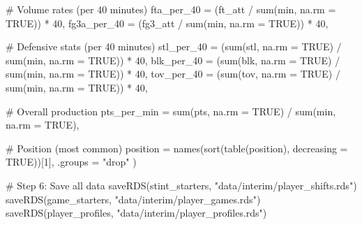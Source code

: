 \documentclass[
  letterpaper,
  DIV=11,
  numbers=noendperiod]{scrartcl}
\newenvironment{Shaded}{\begin{snugshade}}{\end{snugshade}}
\newcommand{\AttributeTok}[1]{\textcolor[rgb]{0.40,0.45,0.13}{#1}}
\newcommand{\CommentTok}[1]{\textcolor[rgb]{0.37,0.37,0.37}{#1}}
\newcommand{\ConstantTok}[1]{\textcolor[rgb]{0.56,0.35,0.01}{#1}}
\newcommand{\DecValTok}[1]{\textcolor[rgb]{0.68,0.00,0.00}{#1}}
\newcommand{\FunctionTok}[1]{\textcolor[rgb]{0.28,0.35,0.67}{#1}}
\newcommand{\NormalTok}[1]{\textcolor[rgb]{0.00,0.23,0.31}{#1}}
\newcommand{\SpecialCharTok}[1]{\textcolor[rgb]{0.37,0.37,0.37}{#1}}
\newcommand{\StringTok}[1]{\textcolor[rgb]{0.13,0.47,0.30}{#1}}
\begin{document}
\begin{Shaded}
\begin{Highlighting}[]
    \CommentTok{\# Volume rates (per 40 minutes)}
    \AttributeTok{fta\_per\_40 =}\NormalTok{ (ft\_att }\SpecialCharTok{/} \FunctionTok{sum}\NormalTok{(min, }\AttributeTok{na.rm =} \ConstantTok{TRUE}\NormalTok{)) }\SpecialCharTok{*} \DecValTok{40}\NormalTok{,}
    \AttributeTok{fg3a\_per\_40 =}\NormalTok{ (fg3\_att }\SpecialCharTok{/} \FunctionTok{sum}\NormalTok{(min, }\AttributeTok{na.rm =} \ConstantTok{TRUE}\NormalTok{)) }\SpecialCharTok{*} \DecValTok{40}\NormalTok{,}

    \CommentTok{\# Defensive stats (per 40 minutes)}
    \AttributeTok{stl\_per\_40 =}\NormalTok{ (}\FunctionTok{sum}\NormalTok{(stl, }\AttributeTok{na.rm =} \ConstantTok{TRUE}\NormalTok{) }\SpecialCharTok{/} \FunctionTok{sum}\NormalTok{(min, }\AttributeTok{na.rm =} \ConstantTok{TRUE}\NormalTok{)) }\SpecialCharTok{*} \DecValTok{40}\NormalTok{,}
    \AttributeTok{blk\_per\_40 =}\NormalTok{ (}\FunctionTok{sum}\NormalTok{(blk, }\AttributeTok{na.rm =} \ConstantTok{TRUE}\NormalTok{) }\SpecialCharTok{/} \FunctionTok{sum}\NormalTok{(min, }\AttributeTok{na.rm =} \ConstantTok{TRUE}\NormalTok{)) }\SpecialCharTok{*} \DecValTok{40}\NormalTok{,}
    \AttributeTok{tov\_per\_40 =}\NormalTok{ (}\FunctionTok{sum}\NormalTok{(tov, }\AttributeTok{na.rm =} \ConstantTok{TRUE}\NormalTok{) }\SpecialCharTok{/} \FunctionTok{sum}\NormalTok{(min, }\AttributeTok{na.rm =} \ConstantTok{TRUE}\NormalTok{)) }\SpecialCharTok{*} \DecValTok{40}\NormalTok{,}

    \CommentTok{\# Overall production}
    \AttributeTok{pts\_per\_min =} \FunctionTok{sum}\NormalTok{(pts, }\AttributeTok{na.rm =} \ConstantTok{TRUE}\NormalTok{) }\SpecialCharTok{/} \FunctionTok{sum}\NormalTok{(min, }\AttributeTok{na.rm =} \ConstantTok{TRUE}\NormalTok{),}

    \CommentTok{\# Position (most common)}
    \AttributeTok{position =} \FunctionTok{names}\NormalTok{(}\FunctionTok{sort}\NormalTok{(}\FunctionTok{table}\NormalTok{(position), }\AttributeTok{decreasing =} \ConstantTok{TRUE}\NormalTok{))[}\DecValTok{1}\NormalTok{],}
    \AttributeTok{.groups =} \StringTok{"drop"}
\NormalTok{  )}


\CommentTok{\# Step 6: Save all data }
\FunctionTok{saveRDS}\NormalTok{(stint\_starters, }\StringTok{"data/interim/player\_shifts.rds"}\NormalTok{)}
\FunctionTok{saveRDS}\NormalTok{(game\_starters, }\StringTok{"data/interim/player\_games.rds"}\NormalTok{)}
\FunctionTok{saveRDS}\NormalTok{(player\_profiles, }\StringTok{"data/interim/player\_profiles.rds"}\NormalTok{)}


\end{Highlighting}
\end{Shaded}
\end{document}
